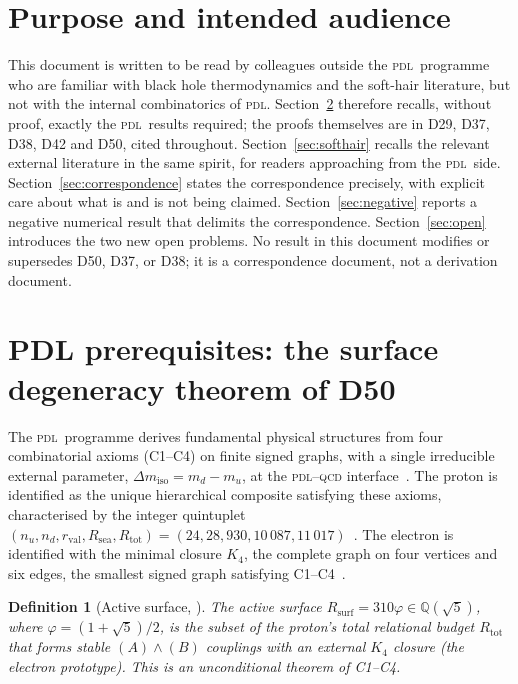 \documentclass[12pt,a4paper]{article}
\newtheorem{definition}[theorem]{Definition}
\newcommand{\Kfour}{K_4}
\newcommand{\PDL}{\textsc{pdl}}
\newcommand{\Rsurf}{R_{\mathrm{surf}}}
\newcommand{\Rtot}{R_{\mathrm{tot}}}
\newcommand{\rval}{r_{\mathrm{val}}}
\newcommand{\Rsea}{R_{\mathrm{sea}}}
\newcommand{\vp}{\varphi}
\newcommand{\Dmiso}{\Delta m_{\mathrm{iso}}}
\begin{document}
\clearpage
\tableofcontents
\newpage

\section{Purpose and intended audience}
\label{sec:purpose}

This document is written to be read by colleagues outside the \PDL\ programme who are familiar with black hole thermodynamics and the soft-hair literature, but not with the internal combinatorics of \PDL. Section~\ref{sec:prereq} therefore recalls, without proof, exactly the \PDL\ results required; the proofs themselves are in D29, D37, D38, D42 and D50, cited throughout. Section~\ref{sec:softhair} recalls the relevant external literature in the same spirit, for readers approaching from the \PDL\ side. Section~\ref{sec:correspondence} states the correspondence precisely, with explicit care about what is and is not being claimed. Section~\ref{sec:negative} reports a negative numerical result that delimits the correspondence. Section~\ref{sec:open} introduces the two new open problems. No result in this document modifies or supersedes D50, D37, or D38; it is a correspondence document, not a derivation document.

\section{PDL prerequisites: the surface degeneracy theorem of D50}
\label{sec:prereq}

The \PDL\ programme derives fundamental physical structures from four combinatorial axioms (C1--C4) on finite signed graphs, with a single irreducible external parameter, $\Dmiso = m_d - m_u$, at the \PDL--\textsc{qcd} interface~\cite{PDL_D01_2026}. The proton is identified as the unique hierarchical composite satisfying these axioms, characterised by the integer quintuplet $(n_u, n_d, \rval, \Rsea, \Rtot) = (24, 28, 930, 10\,087, 11\,017)$~\cite{PDL_D16_2026}. The electron is identified with the minimal closure $\Kfour$, the complete graph on four vertices and six edges, the smallest signed graph satisfying C1--C4~\cite{PDL_D01_2026}.

\begin{definition}[Active surface, \cite{PDL_D05_2026,PDL_D42_2026}]
The active surface $\Rsurf = 310\vp \in \mathbb{Q}(\sqrt{5})$, where $\vp=(1+\sqrt{5})/2$, is the subset of the proton's total relational budget $\Rtot$ that forms stable $(A)\wedge(B)$ couplings with an external $\Kfour$ closure (the electron prototype). This is an unconditional theorem of C1--C4.
\end{definition}
\end{document}
